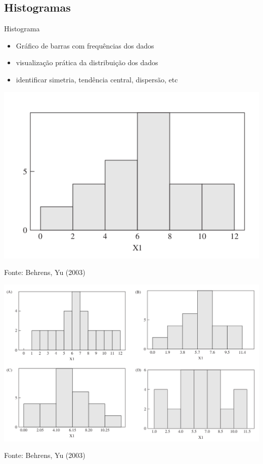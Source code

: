 \documentclass{beamer}
\begin{document}
\subsection{Histogramas}

\begin{frame}{Histograma}
  \begin{itemize}
  \item Gráfico de barras com frequências dos dados
  \item visualização prática da distribuição dos dados
  \item identificar simetria, tendência central, dispersão, etc
  \end{itemize}
\end{frame}

\begin{frame}
  \begin{center}
    \includegraphics[height=0.7\textheight]{EDA/eda-histograma1}
  \end{center}
  Fonte: Behrens, Yu (2003)
\end{frame}

\begin{frame}
  \begin{center}
    \includegraphics[width=1\textwidth]{EDA/eda-histograma2}
  \end{center}
  Fonte: Behrens, Yu (2003)
\end{frame}
\end{document}
